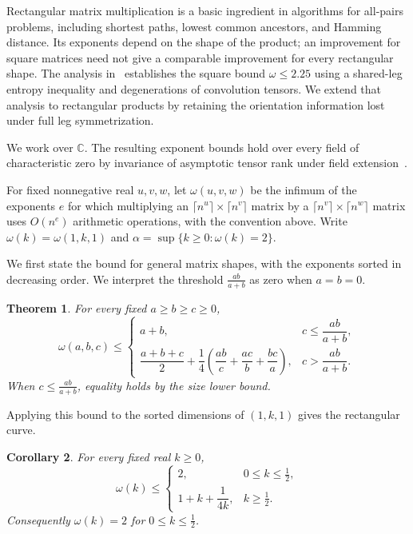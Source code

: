 \documentclass[11pt]{article}
\newtheorem{theorem}{Theorem}[section]
\newtheorem{corollary}[theorem]{Corollary}
\newcommand{\CC}{\mathbb C}
\begin{document}
Rectangular matrix multiplication is a basic ingredient in algorithms
for all-pairs problems, including shortest paths, lowest common ancestors,
and Hamming distance. Its exponents depend on the shape of the product;
an improvement for square matrices need not give a comparable
improvement for every rectangular shape.
The analysis in~\cite{openai-2026-matrix-nine-fourths} establishes the square bound
$\omega\le2.25$ using a shared-leg entropy inequality and degenerations
of convolution tensors. We extend that analysis to
rectangular products by retaining the orientation information lost
under full leg symmetrization.

We work over $\CC$. The resulting exponent bounds hold over every
field of characteristic zero by invariance of asymptotic tensor rank
under field extension~\cite[Theorem~3.10]{strassen-1988-asymptotic-spectrum}.

For fixed nonnegative real $u,v,w$, let $\omega(u,v,w)$ be the infimum
of the exponents $e$ for which multiplying an
$\lceil n^u\rceil\times\lceil n^v\rceil$ matrix by a
$\lceil n^v\rceil\times\lceil n^w\rceil$ matrix uses
$O(n^e)$ arithmetic operations, with the convention above.
Write $\omega(k)=\omega(1,k,1)$ and
$\alpha=\sup\{k\ge0:\omega(k)=2\}$.

We first state the bound for general matrix shapes, with the exponents
sorted in decreasing order. We interpret the threshold $\frac{ab}{a+b}$
as zero when $a=b=0$.

\begin{theorem}\label{cor:general-exponents}
For every fixed $a\ge b\ge c\ge0$,
\begin{equation}\label{eq:general-exponents}
 \omega(a,b,c)\le
 \begin{cases}
 a+b,&c\le\dfrac{ab}{a+b},\\[4pt]
 \dfrac{a+b+c}{2}
 +\dfrac{1}{4}\left(\dfrac{ab}{c}+\dfrac{ac}{b}+\dfrac{bc}{a}\right),
 &c>\dfrac{ab}{a+b}.
 \end{cases}
\end{equation}
When $c\le\frac{ab}{a+b}$, equality holds by the size lower bound.
\end{theorem}

Applying this bound to the sorted dimensions of $(1,k,1)$ gives
the rectangular curve.

\begin{corollary}\label{thm:curve}
For every fixed real $k\ge0$,
\begin{equation}\label{eq:curve}
 \omega(k)\le
 \begin{cases}
 2,&0\le k\le \frac{1}{2},\\[2pt]
 1+k+\dfrac1{4k},&k\ge\frac{1}{2}.
 \end{cases}
\end{equation}
Consequently $\omega(k)=2$ for $0\le k\le\frac{1}{2}$.
\end{corollary}
\end{document}
